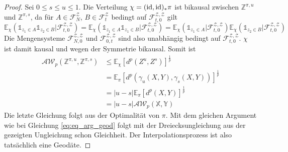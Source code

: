 \begin{proof}
    Sei $0\leq s\leq u\leq 1$. Die Verteilung $\chi = (\operatorname{id}, \operatorname{id})_* \pi$ ist bikausal zwischen $\mathbb{Z}^{\pi,u}$ und $\mathbb{Z}^{\pi,s}$, da für $A \in \mathcal{F}_{N}^\mathcal{Z}$, $B \in \mathcal{F}_t^\mathcal{Z}$ bedingt auf $\mathcal{F}_{t,0}^\mathcal{Z,Z}$ gilt 
    $$\mathbb{E}_\chi(\mathds{1}_{z_1 \in A} \mathds{1}_{z_2\in B} \vert \mathcal{F}_{t,0}^\mathcal{Z,Z}) = \mathbb{E}_\chi(\mathds{1}_{z_1 \in A} \mathds{1}_{z_1 \in B} \vert \mathcal{F}_{t,0}^\mathcal{Z,Z}) = \mathbb{E}_\chi(\mathds{1}_{z_1\in A} \vert \mathcal{F}_{t,0}^\mathcal{Z,Z})\mathbb{E}_\chi(\mathds{1}_{z_2\in B} \vert \mathcal{F}_{t,0}^\mathcal{Z,Z})$$
    Die Mengensysteme $\mathcal{F}_{N,0}^\mathcal{Z,Z}$ und $\mathcal{F}_{0,t}^\mathcal{Z,Z}$ sind also unabhängig bedingt auf $\mathcal{F}_{t,0}^\mathcal{Z,Z}$. $\chi$ ist damit kausal und wegen der Symmetrie bikausal. Somit ist
    \begin{align*}
        \mathcal{AW}_p(\mathbb{Z}^{\pi,u}, \mathbb{Z}^{\pi,s}) &\leq \mathbb{E}_\chi\left[d^p(Z^u, Z^s)\right]^\frac{1}{p} \\
        &= \mathbb{E}_\pi\left[d^p(\gamma_u(X,Y), \gamma_s(X, Y))\right]^\frac{1}{p} \\
        &= |u-s|\mathbb{E}_\pi\left[d^p(X, Y)\right]^\frac{1}{p} \\
        &= |u-s|\mathcal{AW}_p(\mathbb{X}, \mathbb{Y})
    \end{align*}
    Die letzte Gleichung folgt aus der Optimalität von $\pi$. Mit dem gleichen Argument wie bei Gleichung \ref{eq:eq_arg_geod} folgt mit der Dreiecksungleichung aus der gezeigten Ungleichung schon Gleichheit. Der Interpolationsprozess ist also tatsächlich eine Geodäte.
\end{proof}